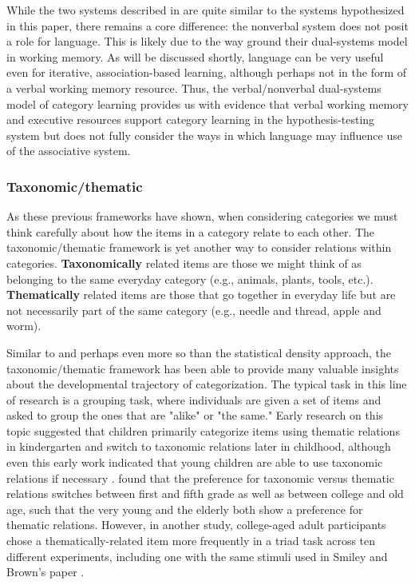 \documentclass[../dissertation.tex]{subfiles}
\begin{document}
	While the two systems described in \citet{Minda2010} are quite similar to the systems hypothesized in this paper, there remains a core difference: the nonverbal system does not posit a role for language. This is likely due to the way \citet{Minda2010} ground their dual-systems model in working memory. As will be discussed shortly, language can be very useful even for iterative, association-based learning, although perhaps not in the form of a verbal working memory resource. Thus, the verbal/nonverbal dual-systems model of category learning provides us with evidence that verbal working memory and executive resources support category learning in the hypothesis-testing system but does not fully consider the ways in which language may influence use of the associative system. 
	
\subsubsection{Taxonomic/thematic}
	As these previous frameworks have shown, when considering categories we must think carefully about how the items in a category relate to each other. The taxonomic/thematic framework is yet another way to consider relations within categories. \textbf{Taxonomically} related items are those we might think of as belonging to the same everyday category (e.g., animals, plants, tools, etc.). \textbf{Thematically} related items are those that go together in everyday life but are not necessarily part of the same category (e.g., needle and thread, apple and worm).  \par
	Similar to and perhaps even more so than the statistical density approach, the taxonomic/thematic framework has been able to provide many valuable insights about the developmental trajectory of categorization. The typical task in this line of research is a grouping task, where individuals are given a set of items and asked to group the ones that are "alike" or "the same." Early research on this topic suggested that children primarily categorize items using thematic relations in kindergarten and switch to taxonomic relations later in childhood, although even this early work indicated that young children are able to use taxonomic relations if necessary \citep{vygotsky1962language,piaget1964early}. \citet{Smiley1979} found that the preference for taxonomic versus thematic relations switches between first and fifth grade as well as between college and old age, such that the very young and the elderly both show a preference for thematic relations. However, in another study, college-aged adult participants chose a thematically-related item more frequently in a triad task across ten different experiments, including one with the same stimuli used in Smiley and Brown's paper \citep{Lin2001}. \par
\end{document}
